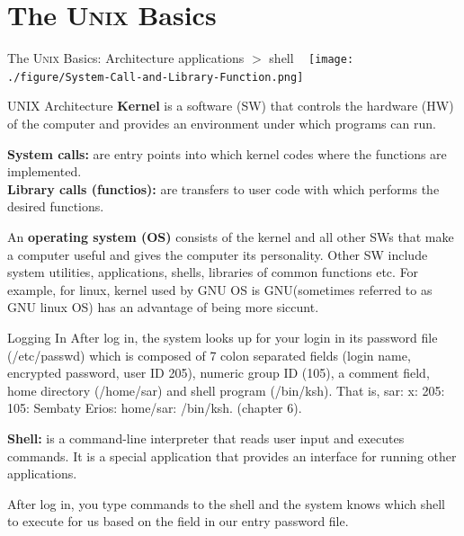 \documentclass[newPxFont,sthlmFooter,nooffset]{beamer}
\begin{document}
\section{The \textsc{Unix} Basics}

\begin{frame}[t]{The \textsc{Unix} Basics: Architecture}
applications $>$ shell
\bigskip
~
\centering
\texttt{[image: ./figure/System-Call-and-Library-Function.png]}
\end{frame}



\begin{frame}[t]{UNIX Architecture}\vspace{4pt}
\textbf{Kernel} is a software (SW) that controls the hardware (HW) of the computer and provides an environment under which programs can run.

\textbf{System calls:} are entry points into which kernel codes where the functions are implemented.\\[6pt]
\textbf{Library calls (functios):} are transfers to user code with which performs the desired functions.

An \textbf{operating system (OS)} consists of the kernel and all other SWs that make a computer useful and gives the computer its personality. Other SW include system utilities, applications, shells, libraries of common functions etc. For example, for linux, kernel used by GNU OS is GNU(sometimes referred to as GNU linux OS) has an advantage of being more siccunt.

\end{frame}

\begin{frame}[t]{Logging In}\vspace{10pt}
After log in, the system looks up for your login in its password file (/etc/passwd) which is composed of 7 colon separated fields (login name, encrypted password, user ID 205), numeric group ID (105), a comment field, home directory (/home/sar) and shell program (/bin/ksh). That is, sar: x: 205: 105: Sembaty Erios: home/sar: /bin/ksh. (chapter 6).

\textbf{Shell:} is a command-line interpreter that reads user input and executes commands. It is a special application that provides an interface for running other applications.

After log in, you type commands to the shell and the system knows which shell to execute for us based on the field in our entry password file. 
\end{frame}
\end{document}
